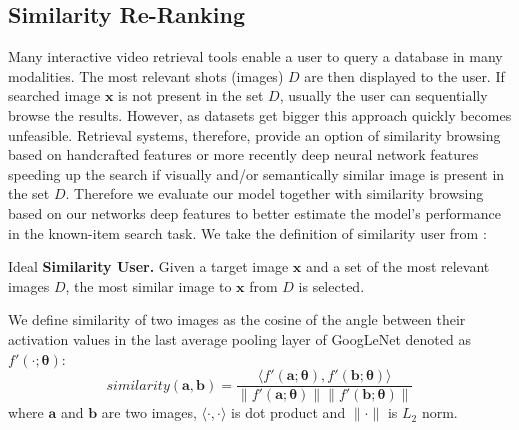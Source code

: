 \subsection{Similarity Re-Ranking}
Many interactive video retrieval tools enable a user to query a database in many modalities. The most relevant shots (images) $D$ are then displayed to the user. If searched image $\bm{x}$ is not present in the set $D$, usually the user can sequentially browse the results. However, as datasets get bigger this approach quickly becomes unfeasible. Retrieval systems, therefore, provide an option of similarity browsing based on handcrafted features or more recently deep neural network features~\cite{lokovc2018revisiting,barthel2018fusing} speeding up the search if visually and/or semantically similar image is present in the set $D$. Therefore we evaluate our model together with similarity browsing based on our networks deep features to better estimate the model's performance in the known-item search task. We take the definition of similarity user from \cite{kovalvcik2017comparison}:
\begin{description}[labelwidth=1em, leftmargin=!]
	\item Ideal \textbf{Similarity User.} Given a target image $\bm{x}$ and a set of the most relevant images $D$, the most similar image to $\bm{x}$ from $D$ is selected.
\end{description}
We define similarity of two images as the cosine of the angle between their activation values in the last average pooling layer of GoogLeNet denoted as $f'(\cdot;\bm{\theta})$:
\begin{equation}
similarity(\bm{a},\bm{b}) = \frac{\langle f'(\bm{a};\bm{\theta}),f'(\bm{b};\bm{\theta})\rangle}{\|f'(\bm{a};\bm{\theta})\|\|f'(\bm{b};\bm{\theta})\|}
\end{equation}
where $\bm{a}$ and $\bm{b}$ are two images, $\langle\cdot,\cdot\rangle$ is dot product and $\|\cdot\|$ is $L_2$ norm.

